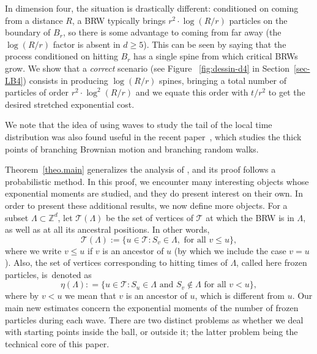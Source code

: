 \documentclass[11pt]{article}
\numberwithin{equation}{section}
\theoremstyle{plain}
\theoremstyle{definition}
\newcommand\Z{\mathbb{Z}}
\newcommand{\1}{{\text{\Large $\mathfrak 1$}}}
\begin{document}
In dimension four, the situation is drastically different: conditioned
on coming from a distance $R$, a BRW typically brings $r^2\cdot \log(R/r)$ particles on
the boundary of $B_r$, so there is some advantage to coming from
far away (the $\log(R/r)$ factor is absent in $d\ge 5$). This can be seen
by saying that the process conditioned on hitting $B_r$ has a single
spine from which critical BRWs grow. We show that a {\it correct} scenario
(see Figure ~\ref{fig:dessin-d4} in Section~\ref{sec-LB4})
consists in producing $\log(R/r)$ spines, bringing a total number
of particles of order $r^2\cdot \log^2(R/r)$ and we equate this order
with $t/r^2$ to get the desired stretched exponential cost.

We note that the idea of using waves to study the tail of the local time distribution was also found useful in the recent paper~\cite{BHJ23}, which studies the thick points of branching Brownian motion and branching random walks.

Theorem~\ref{theo.main} generalizes the analysis of \cite{AHJ},
and its proof follows a probabilistic method. In this proof, we
encounter many interesting objects whose exponential moments
are studied, and they do present interest on their own.
In order to present these additional results, we now define more objects.
For a subset $\Lambda\subset \Z^d$, let $\mathcal T(\Lambda)$
be the set of vertices of $\mathcal T$ at which the BRW is in $\Lambda$, as well as at all its ancestral positions. In other words,
\begin{equation}\label{def.Tr}
\mathbf {\mathcal T}(\Lambda) :=
\big\{u\in \mathbf{\mathcal T}: S_v\in \Lambda, \text{ for all }v\le u\},
\end{equation}
where we write $v\le u$ if $v$ is an ancestor of $u$ (by which we include the case $v=u$).
Also, the set of vertices corresponding to hitting times of $\Lambda$, called here frozen particles, is~denoted as
\begin{equation}\label{etar}
\eta(\Lambda) : = \big\{u\in \mathbf {\mathcal T}: S_u \in \Lambda
\text{ and }S_v \notin \Lambda \text{ for all }v< u\},
\end{equation}
where by $v<u$ we mean that $v$ is an ancestor of $u$, which is different from $u$.
Our main new estimates concern the exponential moments of the
number of frozen particles during each wave. There are two distinct
problems as whether we deal with starting points inside the ball, or outside it;
the latter problem being the technical core of this paper.
\end{document}
